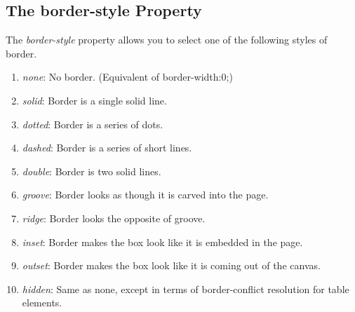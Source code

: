 \documentclass[a4paper,oneside]{book}
\numberwithin{equation}{chapter}
\begin{document}
\subsection{The border-style Property}
The \textit{border-style} property allows you to select one of the following styles of border.
\begin{enumerate}
\item \textit{none}: No border. (Equivalent of border-width:0;)
\item \textit{solid}: Border is a single solid line.
\item \textit{dotted}: Border is a series of dots.
\item \textit{dashed}: Border is a series of short lines.
\item \textit{double}: Border is two solid lines.
\item \textit{groove}: Border looks as though it is carved into the page.
\item \textit{ridge}: Border looks the opposite of groove.
\item \textit{inset}: Border makes the box look like it is embedded in the page.
\item \textit{outset}: Border makes the box look like it is coming out of the canvas.
\item \textit{hidden}: Same as none, except in terms of border-conflict resolution for table elements.
\end{enumerate}
\end{document}
